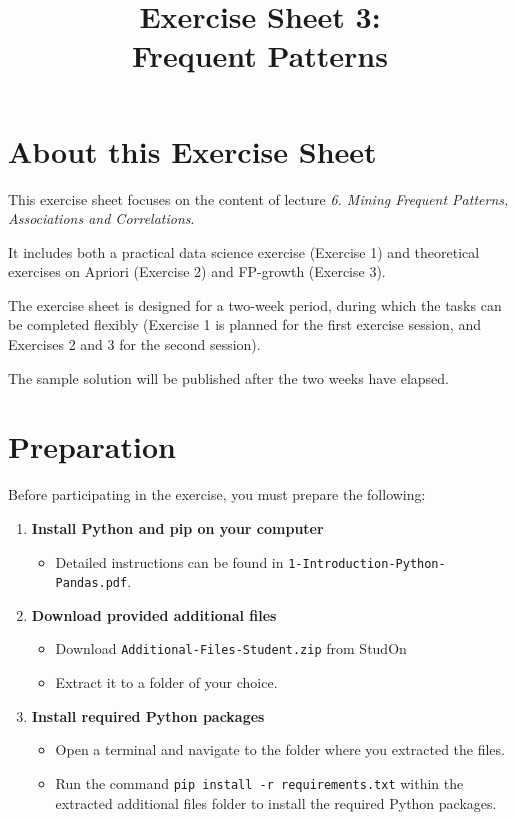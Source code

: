 \documentclass[
english,
smallborders
]{i6prcsht}
\begin{document}
\title{Exercise Sheet 3: \\ Frequent Patterns}
\maketitle
\vspace*{-2cm}

\section*{About this Exercise Sheet}

This exercise sheet focuses on the content of lecture \textit{6. Mining Frequent Patterns, Associations and Correlations}.

It includes both a practical data science exercise (Exercise 1) and theoretical exercises on Apriori (Exercise 2) and FP-growth (Exercise 3).

The exercise sheet is designed for a two-week period, during which the tasks can be completed flexibly (Exercise 1 is planned for the first exercise session, and Exercises 2 and 3 for the second session).

The sample solution will be published after the two weeks have elapsed.

\section*{Preparation}

Before participating in the exercise, you must prepare the following:

\begin{enumerate}
	\item \textbf{Install Python and pip on your computer}
	      
	      \begin{itemize}
		      \item Detailed instructions can be found in \texttt{1-Introduction-Python-Pandas.pdf}.
	      \end{itemize}
	      
	\item \textbf{Download provided additional files}
	      
	      \begin{itemize}
		      \item Download \texttt{Additional-Files-Student.zip} from StudOn
		      \item Extract it to a folder of your choice.
	      \end{itemize}
	      
	\item \textbf{Install required Python packages}
	      
	      \begin{itemize}
		      \item Open a terminal and navigate to the folder where you extracted the files.
		      \item Run the command \texttt{pip install -r requirements.txt} within the extracted additional files folder to install the required Python packages.
	      \end{itemize}
	      
	      
\end{enumerate}
\end{document}
